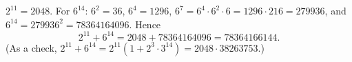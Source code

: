 $2^{11}=2048$. For $6^{14}$: $6^2=36$, $6^4=1296$, $6^7=6^4\cdot6^2\cdot6=1296\cdot216=279936$, and $6^{14}=279936^2=78364164096$. Hence
\[
2^{11}+6^{14}=2048+78364164096=\boxed{78364166144}.
\]
(As a check, $2^{11}+6^{14}=2^{11}\left(1+2^3\cdot3^{14}\right)=2048\cdot38263753$.)
